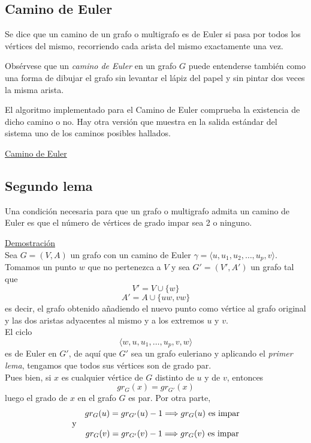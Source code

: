\subsection{Camino de Euler}

\begin{fondo}
Se dice que un camino de un grafo o multigrafo es de Euler si pasa por todos los vértices del mismo, recorriendo cada arista del mismo exactamente una vez.
\end{fondo}

Obsérvese que un \emph{camino de Euler} en un grafo $G$ puede entenderse también como una forma de dibujar el grafo sin levantar el lápiz del papel y sin pintar dos veces la misma arista.\\

\begin{nota}
El algoritmo implementado para el Camino de Euler comprueba la existencia de dicho camino o no. Hay otra versión que muestra en la salida estándar del sistema uno de los caminos posibles hallados.\\
\end{nota}

\underline{Camino de Euler}\\


\subsection{Segundo lema}

\begin{fondo}
Una condición necesaria para que un grafo o multigrafo admita un camino de Euler es que el número de vértices de grado impar sea 2 o ninguno.
\end{fondo}

\underline{Demostración}\\

Sea $G = (V,A)$ un grafo con un camino de Euler $\gamma = \langle u, u_1, u_2, \ldots, u_p, v \rangle$. \\
Tomamos un punto $w$ que no pertenezca a $V$ y sea $G' = (V',A')$ un grafo tal que
\[V' = V \cup \{w\} \]
\[ A' = A \cup \{uw, vw\} \]
es decir, el grafo obtenido añadiendo el nuevo punto como vértice al grafo original y las dos aristas adyacentes al mismo y a los extremos $u$ y $v$.\\
El ciclo
\[ \langle w, u, u_1, \ldots, u_p, v, w \rangle \]
es de Euler en $G'$, de aquí que $G'$ sea un grafo euleriano y aplicando el \emph{primer lema}, tengamos que todos sus vértices son de grado par.\\
Pues bien, si $x$ es cualquier vértice de $G$ distinto de $u$ y de $v$, entonces
\[ gr_G(x) = gr_{G'}(x) \]
luego el grado de $x$ en el grafo $G$ es par. Por otra parte,
\[ \begin{array}{l c}
  & gr_G(u) = gr_{G'}(u) - 1 \Longrightarrow gr_G(u)\ \mbox{es impar} \\
  \mbox{y} &\\
  & gr_G(v) = gr_{G'}(v) - 1 \Longrightarrow gr_G(v)\ \mbox{es impar}
\end{array} \]

